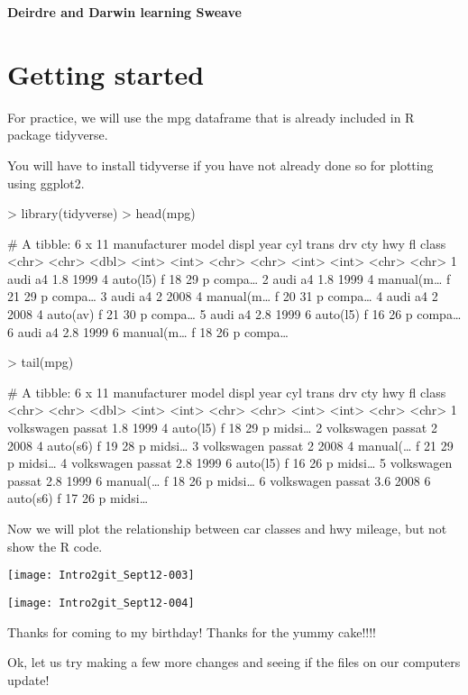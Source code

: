 \documentclass{article}
\begin{document}


\noindent \textbf{\Large{Deirdre and Darwin learning Sweave}}
\author{Deirdre & Darwin }

\section {Getting started}
\newline 

For practice, we will use the mpg dataframe that is already included in R package tidyverse. 

You will have to install tidyverse if you have not already done so for plotting using ggplot2.

\begin{Schunk}
\begin{Sinput}
> library(tidyverse)
> head(mpg)
\end{Sinput}
\begin{Soutput}
# A tibble: 6 x 11
  manufacturer model displ  year   cyl trans     drv     cty   hwy fl    class 
  <chr>        <chr> <dbl> <int> <int> <chr>     <chr> <int> <int> <chr> <chr> 
1 audi         a4      1.8  1999     4 auto(l5)  f        18    29 p     compa…
2 audi         a4      1.8  1999     4 manual(m… f        21    29 p     compa…
3 audi         a4      2    2008     4 manual(m… f        20    31 p     compa…
4 audi         a4      2    2008     4 auto(av)  f        21    30 p     compa…
5 audi         a4      2.8  1999     6 auto(l5)  f        16    26 p     compa…
6 audi         a4      2.8  1999     6 manual(m… f        18    26 p     compa…
\end{Soutput}
\end{Schunk}

\begin{Schunk}
\begin{Sinput}
> tail(mpg)
\end{Sinput}
\begin{Soutput}
# A tibble: 6 x 11
  manufacturer model  displ  year   cyl trans    drv     cty   hwy fl    class 
  <chr>        <chr>  <dbl> <int> <int> <chr>    <chr> <int> <int> <chr> <chr> 
1 volkswagen   passat   1.8  1999     4 auto(l5) f        18    29 p     midsi…
2 volkswagen   passat   2    2008     4 auto(s6) f        19    28 p     midsi…
3 volkswagen   passat   2    2008     4 manual(… f        21    29 p     midsi…
4 volkswagen   passat   2.8  1999     6 auto(l5) f        16    26 p     midsi…
5 volkswagen   passat   2.8  1999     6 manual(… f        18    26 p     midsi…
6 volkswagen   passat   3.6  2008     6 auto(s6) f        17    26 p     midsi…
\end{Soutput}
\end{Schunk}

Now we will plot the relationship between car classes and hwy mileage, but not show the R code.

\texttt{[image: Intro2git\_Sept12-003]}

\texttt{[image: Intro2git\_Sept12-004]}

Thanks for coming to my birthday!
Thanks for the yummy cake!!!!

Ok, let us try making a few more changes and seeing if the files on our computers update!
\end{document}
